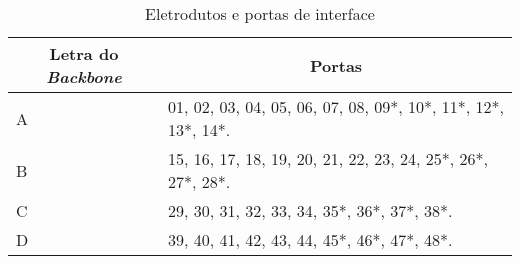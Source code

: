 \begin{table}[h!]
	\centering
\caption{Eletrodutos e portas de interface}
\label{tab4}
	\renewcommand{\arraystretch}{2.0}
	\begin{tabular}{|l|l|}
		\hline
		\multicolumn{1}{|c|}{\textbf{Letra do \textit{Backbone}}} &	 \multicolumn{1}{|c|}{\textbf{Portas}}                                 		  \\ \hline		A                                
		& 01, 02, 03, 04, 05, 06, 07, 08, 09*, 10*, 11*, 12*, 13*, 14*.                                             \\ \hline
		B                               
		& 15, 16, 17, 18, 19, 20, 21, 22, 23, 24, 25*, 26*, 27*, 28*.         					\\ \hline
		C                                  
		& 29, 30, 31, 32, 33, 34, 35*, 36*, 37*, 38*.          \\ \hline
		D 
		& 39, 40, 41, 42, 43, 44, 45*, 46*, 47*, 48*.         \\ \hline
		
	\end{tabular}
\end{table}
